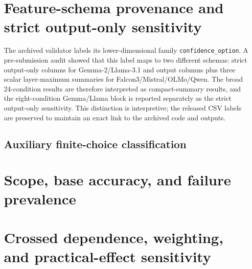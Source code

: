\documentclass[preprint,12pt]{elsarticle}
\begin{document}
\section{Feature-schema provenance and strict output-only sensitivity}
The archived validator labels its lower-dimensional family \texttt{confidence\_}\allowbreak\texttt{option}. A pre-submission audit showed that this label maps to two different schemas: strict output-only columns for Gemma-2/Llama-3.1 and output columns plus three scalar layer-maximum summaries for Falcon3/Mistral/OLMo/Qwen. The broad 24-condition results are therefore interpreted as compact-summary results, and the eight-condition Gemma/Llama block is reported separately as the strict output-only sensitivity. This distinction is interpretive; the released CSV labels are preserved to maintain an exact link to the archived code and outputs.


\FloatBarrier

\FloatBarrier

\begin{landscape}
\section{Auxiliary finite-choice classification}

\end{landscape}
\FloatBarrier

\clearpage
\section{Scope, base accuracy, and failure prevalence}

\FloatBarrier

\FloatBarrier
\begin{landscape}

\FloatBarrier
\end{landscape}

\clearpage
\section{Crossed dependence, weighting, and practical-effect sensitivity}

\FloatBarrier

\FloatBarrier

\FloatBarrier
\begin{landscape}

\FloatBarrier
\end{landscape}
\end{document}
